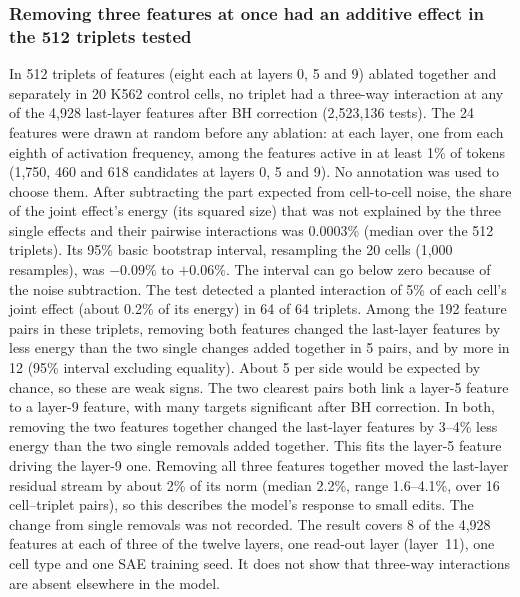 \documentclass[10pt,letterpaper]{article}
\begin{document}
\subsubsection*{Removing three features at once had an additive effect in the 512 triplets tested}
In 512 triplets of features (eight each at layers 0, 5 and 9) ablated
together and separately in 20 K562 control cells, no triplet had a
three-way interaction at any of the 4,928 last-layer features after BH
correction (2,523,136 tests). The 24 features were drawn at random before
any ablation: at each layer, one from each eighth of activation
frequency, among the features active in at least 1\% of tokens (1,750,
460 and 618 candidates at layers 0, 5 and 9). No annotation was used to
choose them. After subtracting the part expected from cell-to-cell
noise, the share of the joint effect's energy (its squared size) that
was not explained by the three single effects and their pairwise
interactions was 0.0003\% (median over the 512 triplets). Its 95\% basic
bootstrap interval, resampling the 20 cells (1,000 resamples), was
$-0.09\%$ to $+0.06\%$. The interval can go below zero because of the
noise subtraction. The test detected a planted interaction of 5\% of each
cell's joint effect (about 0.2\% of its energy) in 64 of 64 triplets.
Among the 192 feature pairs in these triplets, removing both features
changed the last-layer features by less energy than the two single
changes added together in 5 pairs, and by more in 12 (95\% interval
excluding equality). About 5 per side would be expected by chance, so
these are weak signs. The two clearest pairs both link a layer-5 feature to a layer-9 feature,
with many targets significant after BH correction. In both, removing the
two features together changed the last-layer features by 3--4\% less
energy than the two single removals added together. This fits the
layer-5 feature driving the layer-9 one. Removing all three features together moved the
last-layer residual stream by about 2\% of its norm (median 2.2\%, range
1.6--4.1\%, over 16 cell--triplet pairs), so this describes the model's
response to small edits. The change from single removals was not
recorded. The result covers 8 of the 4,928 features at each of three of
the twelve layers, one read-out layer (layer~11), one cell type and one
SAE training seed. It does not show that three-way interactions are
absent elsewhere in the model.
\end{document}
